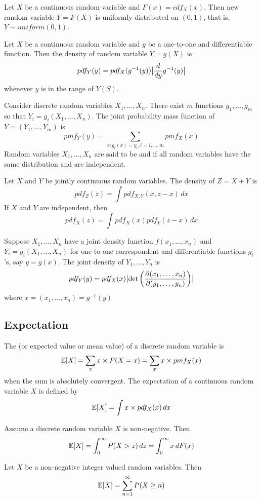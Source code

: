 \documentclass[11pt]{article}
\begin{document}
\theorem 
Let $X$ be a continuous random variable and $F(x) = cdf_X(x)$. Then new random variable $Y=F(X)$ is uniformly distributed on $(0,1)$, that is, $Y \sim uniform(0,1)$.

Let $X$ be a continuous random variable and $g$ be a one-to-one and differentiable function. Then the density of random variable $Y = g(X)$ is
$$pdf_Y(y) = pdf_X(g^{-1}(y))\big \vert {\frac{d}{dy}g^{-1}(y)} \big \vert$$
whenever $y$ is in the range of $Y(S)$.

\theorem
Consider discrete random variables $X_1, \hdots, X_n$. There exist $m$ functions $g_1, \hdots, g_m$ so that $Y_i = g_i(X_1, \hdots, X_n)$. The joint probability mass function of $Y = (Y_1, \hdots, Y_m)$ is 
$$pmf_Y(y) = \sum_{x:g_i(x) = y_i, i=1,\hdots,m} pmf_X(x)$$
Random variables $X_1, \hdots, X_n$ are said to be  and  if all random variables have the same distribution and are independent.

\theorem
Let $X$ and $Y$ be jointly continuous random variables. The density of $Z = X + Y$ is
$$pdf_Z(z) = \int pdf_{X,Y}(x,z-x) \, dx$$
If $X$ and $Y$ are independent, then
$$pdf_X(z) = \int pdf_X(x)pdf_Y(z-x)\, dx$$

Suppose $X_1, \hdots, X_n$ have a joint density function $f(x_1, \hdots, x_n)$ and $Y_i = g_i(X_1, \hdots, X_n)$ for one-to-one correspondent and differentiable functions $g_i$'s, say $y = g(x)$. The joint density of $Y_1, \hdots, Y_n$ is
$$pdf_Y(y) = pdf_X(x) \big \vert { \det \left ( \frac{\partial(x_1, \hdots, x_n)}{\partial(y_1, \hdots, y_n)} \right)} \big \vert$$
where $x = (x_1, \hdots, x_n) = g^{-1}(y)$

\subsection{Expectation}
The  (or expected value or mean value) of a discrete random variable is 
$$\mathbb{E}[{X}] = \sum_x x \times P(X=x) = \sum_x x \times pmf_X(x)$$
when the sum is absolutely convergent.
The expectation of a continuous random variable $X$ is defined by
$$\mathbb{E}[{X}] = \int x \times pdf_X(x) \, dx$$

\theorem
Assume a discrete random variable $X$ is non-negative. Then
$$\mathbb{E}[{X}] = \int_0^\infty P(X > z)\, dz = \int_0^\infty x \, dF(x)$$

\corollary
Let $X$ be a non-negative integer valued random variables. Then
$$\mathbb{E}[{X}] = \sum_{n=1}^\infty P(X \geq n)$$
\end{document}

